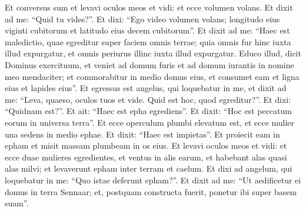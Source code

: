 \begin{biblechapter}
\begin{biblechapter}
\begin{biblechapter}
\begin{biblechapter}
\begin{biblechapter}
\verse Et conversus sum et levavi oculos meos et vidi: et ecce volumen volans. 
\verse Et dixit ad me: “Quid tu vides?”. Et dixi: “Ego video volumen volans; longitudo eius viginti cubitorum et latitudo eius decem cubitorum”. 
\verse Et dixit ad me: “Haec est maledictio, quae egreditur super faciem omnis terrae; quia omnis fur hinc iuxta illud expurgatur, et omnis periurus illinc iuxta illud expurgatur. 
\verse Educo illud, dicit Dominus exercituum, et veniet ad domum furis et ad domum iurantis in nomine meo mendaciter; et commorabitur in medio domus eius, et consumet eam et ligna eius et lapides eius”.
 \verse Et egressus est angelus, qui loquebatur in me, et dixit ad me: “Leva, quaeso, oculos tuos et vide. Quid est hoc, quod egreditur?”. 
\verse Et dixi: “Quidnam est?”. Et ait: “Haec est epha egrediens”. Et dixit: “Hoc est peccatum eorum in universa terra”. 
\verse Et ecce operculum plumbi elevatum est, et ecce mulier una sedens in medio ephae. 
\verse Et dixit: “Haec est impietas”. Et proiecit eam in epham et misit massam plumbeam in os eius.
 \verse Et levavi oculos meos et vidi: et ecce duae mulieres egredientes, et ventus in alis earum, et habebant alas quasi alas milvi; et levaverunt epham inter terram et caelum. 
\verse Et dixi ad angelum, qui loquebatur in me: “Quo istae deferunt epham?”. 
\verse Et dixit ad me: “Ut aedificetur ei domus in terra Sennaar; et, postquam constructa fuerit, ponetur ibi super basem suam”.
 

\end{biblechapter}
\end{biblechapter}
\end{biblechapter}
\end{biblechapter}
\end{biblechapter}
